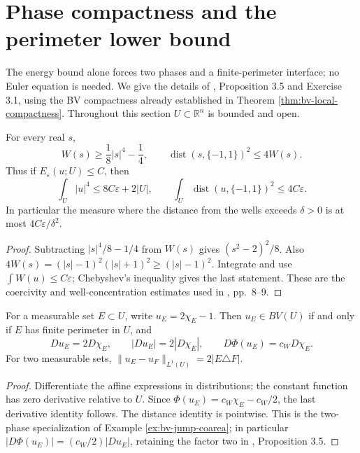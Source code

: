 \chapter{Phase compactness and the perimeter lower bound}\label{sec:phase-compactness}
The energy bound alone forces two phases and a finite-perimeter interface; no Euler equation is needed. We give the details of \cite{ChAC}, Proposition 3.5 and Exercise 3.1, using the BV compactness already established in Theorem \ref{thm:bv-local-compactness}. Throughout this section $U\subset\mathbb R^n$ is bounded and open.

\begin{lemma}\label{lem:phase-coercivity}
For every real $s$,
\[
 W(s)\geq\frac18|s|^4-\frac14,
 \qquad \operatorname{dist}(s,\{-1,1\})^2\leq4W(s).
\]
Thus if $E_\varepsilon(u;U)\leq C$, then
\[
 \int_U|u|^4\leq8C\varepsilon+2|U|,
 \qquad
 \int_U\operatorname{dist}(u,\{-1,1\})^2\leq4C\varepsilon.
\]
In particular the measure where the distance from the wells exceeds $\delta>0$ is at most $4C\varepsilon/\delta^2$.
\end{lemma}
\begin{proof}
Subtracting $|s|^4/8-1/4$ from $W(s)$ gives $(s^2-2)^2/8$. Also $4W(s)=(|s|-1)^2(|s|+1)^2\geq(|s|-1)^2$. Integrate and use $\int W(u)\leq C\varepsilon$; Chebyshev's inequality gives the last statement. These are the coercivity and well-concentration estimates used in \cite{ChAC}, pp.~8--9.
\end{proof}

\begin{proposition}\label{prop:phase-bv-normalization}
For a measurable set $E\subset U$, write $u_E=2\chi_E-1$. Then $u_E\in BV(U)$ if and only if $E$ has finite perimeter in $U$, and
\[
 Du_E=2D\chi_E,\qquad |Du_E|=2|D\chi_E|,
 \qquad D\Phi(u_E)=c_WD\chi_E.
\]
For two measurable sets, $\|u_E-u_F\|_{L^1(U)}=2|E\triangle F|$.
\end{proposition}
\begin{proof}
Differentiate the affine expressions in distributions; the constant function has zero derivative relative to $U$. Since $\Phi(u_E)=c_W\chi_E-c_W/2$, the last derivative identity follows. The distance identity is pointwise. This is the two-phase specialization of Example \ref{ex:bv-jump-coarea}; in particular $|D\Phi(u_E)|=(c_W/2)|Du_E|$, retaining the factor two in \cite{ChAC}, Proposition 3.5.
\end{proof}

